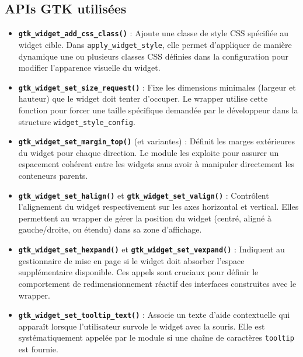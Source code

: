 \subsection{APIs GTK utilisées}

\begin{itemize}
    \item \textbf{\texttt{gtk\_widget\_add\_css\_class()}} : Ajoute une classe de style CSS spécifiée au widget cible. Dans \texttt{apply\_widget\_style}, elle permet d'appliquer de manière dynamique une ou plusieurs classes CSS définies dans la configuration pour modifier l'apparence visuelle du widget.
    \item \textbf{\texttt{gtk\_widget\_set\_size\_request()}} : Fixe les dimensions minimales (largeur et hauteur) que le widget doit tenter d'occuper. Le wrapper utilise cette fonction pour forcer une taille spécifique demandée par le développeur dans la structure \texttt{widget\_style\_config}.
    \item \textbf{\texttt{gtk\_widget\_set\_margin\_top()}} (et variantes) : Définit les marges extérieures du widget pour chaque direction. Le module les exploite pour assurer un espacement cohérent entre les widgets sans avoir à manipuler directement les conteneurs parents.
    \item \textbf{\texttt{gtk\_widget\_set\_halign()}} et \textbf{\texttt{gtk\_widget\_set\_valign()}} : Contrôlent l'alignement du widget respectivement sur les axes horizontal et vertical. Elles permettent au wrapper de gérer la position du widget (centré, aligné à gauche/droite, ou étendu) dans sa zone d'affichage.
    \item \textbf{\texttt{gtk\_widget\_set\_hexpand()}} et \textbf{\texttt{gtk\_widget\_set\_vexpand()}} : Indiquent au gestionnaire de mise en page si le widget doit absorber l'espace supplémentaire disponible. Ces appels sont cruciaux pour définir le comportement de redimensionnement réactif des interfaces construites avec le wrapper.
    \item \textbf{\texttt{gtk\_widget\_set\_tooltip\_text()}} : Associe un texte d'aide contextuelle qui apparaît lorsque l'utilisateur survole le widget avec la souris. Elle est systématiquement appelée par le module si une chaîne de caractères \texttt{tooltip} est fournie.
\end{itemize}

\newpage
